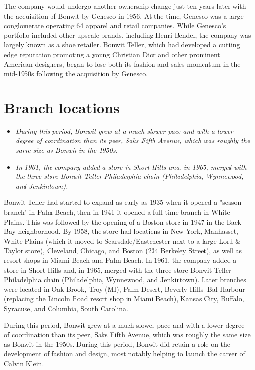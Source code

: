 The company would undergo another ownership change just ten years later
with the acquisition of Bonwit by Genesco in 1956. At the time, Genesco
was a large conglomerate operating 64 apparel and retail companies.
While Genesco's portfolio included other upscale brands, including Henri
Bendel, the company was largely known as a shoe retailer. Bonwit Teller,
which had developed a cutting edge reputation promoting a young
Christian Dior and other prominent American designers, began to lose
both its fashion and sales momentum in the mid-1950s following the
acquisition by Genesco.

\section{Branch locations}\label{branch-locations}

\begin{itemize}
\item
  \emph{During this period, Bonwit grew at a much slower pace and with a
  lower degree of coordination than its peer, Saks Fifth Avenue, which
  was roughly the same size as Bonwit in the 1950s.}
\item
  \emph{In 1961, the company added a store in Short Hills and, in 1965,
  merged with the three-store Bonwit Teller Philadelphia chain
  (Philadelphia, Wynnewood, and Jenkintown).}
\end{itemize}

Bonwit Teller had started to expand as early as 1935 when it opened a
"season branch" in Palm Beach, then in 1941 it opened a full-time branch
in White Plains. This was followed by the opening of a Boston store in
1947 in the Back Bay neighborhood. By 1958, the store had locations in
New York, Manhasset, White Plains (which it moved to
Scarsdale/Eastchester next to a large Lord \& Taylor store), Cleveland,
Chicago, and Boston (234 Berkeley Street), as well as resort shops in
Miami Beach and Palm Beach. In 1961, the company added a store in Short
Hills and, in 1965, merged with the three-store Bonwit Teller
Philadelphia chain (Philadelphia, Wynnewood, and Jenkintown). Later
branches were located in Oak Brook, Troy (MI), Palm Desert, Beverly
Hills, Bal Harbour (replacing the Lincoln Road resort shop in Miami
Beach), Kansas City, Buffalo, Syracuse, and Columbia, South Carolina.

During this period, Bonwit grew at a much slower pace and with a lower
degree of coordination than its peer, Saks Fifth Avenue, which was
roughly the same size as Bonwit in the 1950s. During this period, Bonwit
did retain a role on the development of fashion and design, most notably
helping to launch the career of Calvin Klein.

